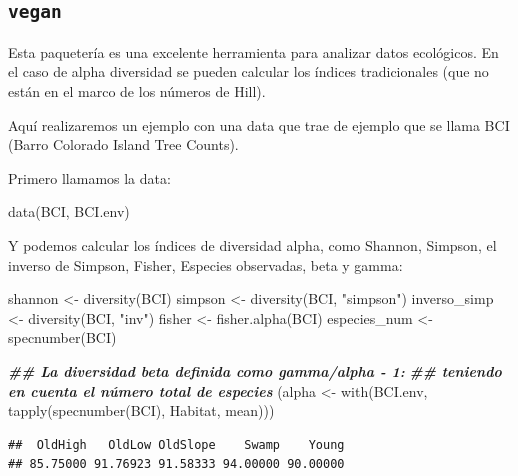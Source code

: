 \documentclass[
]{article}
\newenvironment{Shaded}{\begin{snugshade}}{\end{snugshade}}
\newcommand{\DocumentationTok}[1]{\textcolor[rgb]{0.56,0.35,0.01}{\textbf{\textit{#1}}}}
\newcommand{\FunctionTok}[1]{\textcolor[rgb]{0.00,0.00,0.00}{#1}}
\newcommand{\NormalTok}[1]{#1}
\newcommand{\OtherTok}[1]{\textcolor[rgb]{0.56,0.35,0.01}{#1}}
\newcommand{\StringTok}[1]{\textcolor[rgb]{0.31,0.60,0.02}{#1}}
\begin{document}
\hypertarget{vegan}{%
\subsection{\texorpdfstring{\texttt{vegan}}{vegan}}\label{vegan}}

Esta paquetería es una excelente herramienta para analizar datos
ecológicos. En el caso de alpha diversidad se pueden calcular los
índices tradicionales (que no están en el marco de los números de Hill).

Aquí realizaremos un ejemplo con una data que trae de ejemplo que se
llama BCI (Barro Colorado Island Tree Counts).

Primero llamamos la data:

\begin{Shaded}
\begin{Highlighting}[]
\FunctionTok{data}\NormalTok{(BCI, BCI.env)}
\end{Highlighting}
\end{Shaded}

Y podemos calcular los índices de diversidad alpha, como Shannon,
Simpson, el inverso de Simpson, Fisher, Especies observadas, beta y
gamma:

\begin{Shaded}
\begin{Highlighting}[]
\NormalTok{shannon }\OtherTok{\textless{}{-}} \FunctionTok{diversity}\NormalTok{(BCI)}
\NormalTok{simpson }\OtherTok{\textless{}{-}} \FunctionTok{diversity}\NormalTok{(BCI, }\StringTok{"simpson"}\NormalTok{)}
\NormalTok{inverso\_simp }\OtherTok{\textless{}{-}} \FunctionTok{diversity}\NormalTok{(BCI, }\StringTok{"inv"}\NormalTok{)}
\NormalTok{fisher }\OtherTok{\textless{}{-}} \FunctionTok{fisher.alpha}\NormalTok{(BCI)}
\NormalTok{especies\_num }\OtherTok{\textless{}{-}} \FunctionTok{specnumber}\NormalTok{(BCI) }

\DocumentationTok{\#\# La diversidad beta definida como gamma/alpha {-} 1:}
\DocumentationTok{\#\# teniendo en cuenta el número total de especies}
\NormalTok{(alpha }\OtherTok{\textless{}{-}} \FunctionTok{with}\NormalTok{(BCI.env, }\FunctionTok{tapply}\NormalTok{(}\FunctionTok{specnumber}\NormalTok{(BCI), Habitat, mean)))}
\end{Highlighting}
\end{Shaded}

\begin{verbatim}
##  OldHigh   OldLow OldSlope    Swamp    Young 
## 85.75000 91.76923 91.58333 94.00000 90.00000
\end{verbatim}
\end{document}
